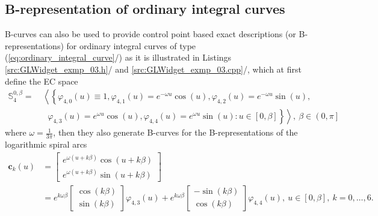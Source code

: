 \documentclass[b5paper, twosided]{book}
\DeclareRobustCommand{\mref}[1]{\ref{#1}{\relsize{-1}/\pageref{#1}}}
\begin{document}
\subsection{B-representation of ordinary integral curves}\label{subsec:B_representation_of_ordinary_integral_curves}

B-curves can also be used to provide control point based exact descriptions (or B-representations) for ordinary integral curves of type (\mref{eq:ordinary_integral_curve}) as it is illustrated in Listings \mref{src:GLWidget_exmp_03.h} and \mref{src:GLWidget_exmp_03.cpp}, which at first define the EC space
\begin{align*}
\mathbb{S}_4^{0,\beta}
=&~
\left\langle
\left\{
\varphi_{4,0}\left(u\right) \equiv 1,
\varphi_{4,1}\left(u\right)=e^{-\omega u} \cos\left(u\right),
\varphi_{4,2}\left(u\right)=e^{-\omega u} \sin\left(u\right),
\right.
\right.
\\
&~~~\,
\left.
\left.
\varphi_{4,3}\left(u\right)=e^{\omega u} \cos\left(u\right),
\varphi_{4,4}\left(u\right)=e^{\omega u} \sin\left(u\right):
u \in \left[0,\beta\right]
\right\}
\right\rangle,~\beta \in \left(0,\pi\right]
\end{align*}
where $\omega = \frac{1}{3\pi}$, then they also generate B-curves for the B-representations of the logarithmic spiral arcs 
\begin{align}
\mathbf{c}_k\left(u\right) &=
\left[
\begin{array}{c}
e^{\omega \left(u+k\beta\right)} \cos\left(u+k\beta\right)\\
e^{\omega \left(u+k\beta\right)} \sin\left(u+k\beta\right)
\end{array}
\right]
\nonumber
\\
&=
e^{k\omega\beta}
\left[
\begin{array}{c}
\cos\left(k\beta\right)
\\
\sin\left(k\beta\right)
\end{array}
\right]
\varphi_{4,3}\left(u\right)
+
e^{k\omega\beta}
\left[
\begin{array}{r}
-\sin\left(k\beta\right)\\
\cos\left(k\beta\right)
\end{array}
\right]
\varphi_{4,4}\left(u\right), ~ u \in \left[0,\beta\right],~k=0,\ldots,6.
\label{eq:logarithmic_spiral}
\end{align}

\newpage{}

\end{document}
